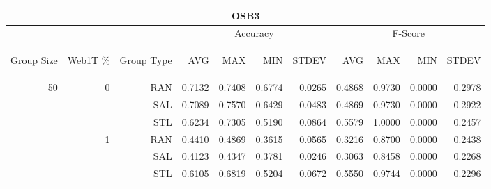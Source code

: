 \begin{center}
\begin{table}[htbp]
\begin{tabular}{ | r | r | r | r | r | r | r | r | r | r | r |}
\hline
\multicolumn{11}{|c|}{OSB3}\\
\hline
 & & & \multicolumn{4}{|c|}{Accuracy} & \multicolumn{4}{|c|}{F-Score}\\ \cline{4-11}
\begin{sideways}Group Size\end{sideways} & \begin{sideways}Web1T \%\end{sideways} & \begin{sideways}Group Type\end{sideways} & \begin{sideways}AVG\end{sideways} & \begin{sideways}MAX\end{sideways} & \begin{sideways}MIN\end{sideways} & \begin{sideways}STDEV\end{sideways} & \begin{sideways}AVG\end{sideways} & \begin{sideways}MAX\end{sideways} & \begin{sideways}MIN\end{sideways} & \begin{sideways}STDEV\end{sideways}\\
\hline
\multirow{12}{*}{50}
 & \multirow{3}{*}{0} & RAN & 0.7132 & 0.7408 & 0.6774 & 0.0265 & 0.4868 & 0.9730 & 0.0000 & 0.2978\\ \cline{3-11}
 &   & SAL & 0.7089 & 0.7570 & 0.6429 & 0.0483 & 0.4869 & 0.9730 & 0.0000 & 0.2922\\ \cline{3-11}
 &   & STL & 0.6234 & 0.7305 & 0.5190 & 0.0864 & 0.5579 & 1.0000 & 0.0000 & 0.2457\\ \cline{2-11}
 & \multirow{3}{*}{1} & RAN & 0.4410 & 0.4869 & 0.3615 & 0.0565 & 0.3216 & 0.8700 & 0.0000 & 0.2438\\ \cline{3-11}
 &   & SAL & 0.4123 & 0.4347 & 0.3781 & 0.0246 & 0.3063 & 0.8458 & 0.0000 & 0.2268\\ \cline{3-11}
 &   & STL & 0.6105 & 0.6819 & 0.5204 & 0.0672 & 0.5550 & 0.9744 & 0.0000 & 0.2296\\ \cline{2-11}

\end{tabular}
\end{table}
\end{center}
